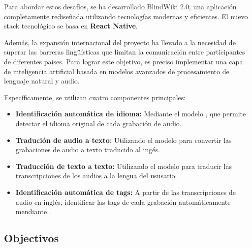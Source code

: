Para abordar estos desafíos, se ha desarrollado BlindWiki 2.0, una aplicación completamente rediseñada utilizando tecnologías modernas y eficientes. El nuevo stack tecnológico se basa en \textbf{React Native}.

Además, la expansión internacional del proyecto ha llevado a la necesidad de superar las barreras lingüísticas que limitan la comunicación entre participantes de diferentes países. Para lograr este objetivo, es preciso implementar una capa de inteligencia artificial basada en modelos avanzados de procesamiento de lenguaje natural y audio. 

Específicamente, se utilizan cuatro componentes principales:
\begin{itemize}
    \item \textbf{Identificación automática de idioma:} Mediante el modelo \TODO, que permite detectar el idioma original de cada grabación de audio.
    \item \textbf{Tradución de audio a texto:} Utilizando el modelo \TODO para convertir las grabaciones de audio a texto traducido al ingés.
    \item \textbf{Traducción de texto a texto:} Utilizando el modelo \TODO para traducir las transcripciones de los audios a la lengua del ususario.
    \item \textbf{Identificación automática de tags:} A partir de las transcripciones de audio en inglés, identificar las tags de cada grabación automáticamente mendiante \TODO.
\end{itemize}

\subsection{Objectivos}